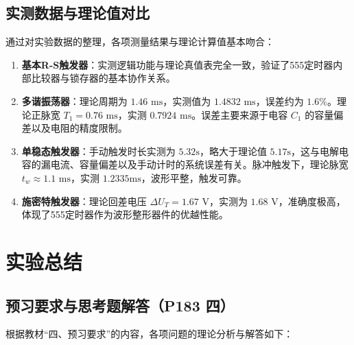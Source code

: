 ﻿\documentclass[10.5pt]{config}
\begin{document}
\subsection{实测数据与理论值对比}
通过对实验数据的整理，各项测量结果与理论计算值基本吻合：
\begin{enumerate}
    \item \textbf{基本R-S触发器}：实测逻辑功能与理论真值表完全一致，验证了555定时器内部比较器与锁存器的基本协作关系。
    \item \textbf{多谐振荡器}：理论周期为 $1.46\text{ ms}$，实测值为 $1.4832\text{ ms}$，误差约为 $1.6\%$。理论正脉宽 $T_1 = 0.76\text{ ms}$，实测 $0.7924\text{ ms}$。误差主要来源于电容 $C_1$ 的容量偏差以及电阻的精度限制。
    \item \textbf{单稳态触发器}：手动触发时长实测为 $5.32\text{s}$，略大于理论值 $5.17\text{s}$，这与电解电容的漏电流、容量偏差以及手动计时的系统误差有关。脉冲触发下，理论脉宽 $t_w \approx 1.1\text{ ms}$，实测 $1.2335\text{ms}$，波形平整，触发可靠。
    \item \textbf{施密特触发器}：理论回差电压 $\Delta U_T = 1.67\text{ V}$，实测为 $1.68\text{ V}$，准确度极高，体现了555定时器作为波形整形器件的优越性能。
\end{enumerate}



\section{实验总结}

\subsection{预习要求与思考题解答（P183 四）}
根据教材“四、预习要求”的内容，各项问题的理论分析与解答如下：
\end{document}
